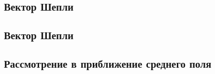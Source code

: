 


\subsection{Вектор Шепли}



\subsection{Вектор Шепли}


\subsection{Рассмотрение в приближение среднего поля}